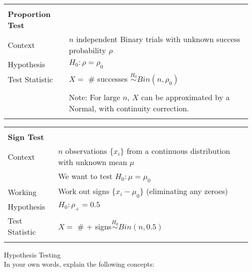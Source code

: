 \documentclass[bigtut]{tutorial}\usepackage[]{graphicx}\usepackage[]{color}
\begin{document}

\begin{tutorial}

\begin{center}
\begin{tabular}{| ll |} \hline
& \\
{\bf Proportion Test} & \\
Context & $n$ independent Binary trials with unknown success probability $\rho$ \\
Hypothesis &   $H_{0}: \rho = \rho_{0}$   \\
Test Statistic & $X=$ \# successes $  \overset{H_0}{\sim} Bin(n, \rho_{0})$      \\ 
& \\  
& Note: For large $n$, $X$ can be approximated by a Normal, with continuity correction. \\ 
& \\ \hline
\end{tabular}
\end{center}


\begin{center}
\begin{tabular}{| ll |} \hline
& \\
{\bf Sign Test} & \\
Context &  $n$ observations $ \{ x_{i} \} $ from a continuous distribution with unknown mean $\mu$ \\
& We want to test $H_{0}: \mu = \mu_{0}$ \\
Working & Work out signs $ \{ x_{i} -\mu_{0} \}$ (eliminating any zeroes)  \\
Hypothesis &   $H_{0}: \rho_{+} =0.5$   \\
Test Statistic & $X=$ \# + signs$  \overset{H_0}{\sim} Bin(n, 0.5)$      \\ 
& \\  \hline
\end{tabular}
\end{center}



 \begin{questions}

\vspace{.5cm}
\question  Hypothesis Testing  \\

In your own words, explain the following concepts: \\

\end{questions}
\end{tutorial}
\end{document}
